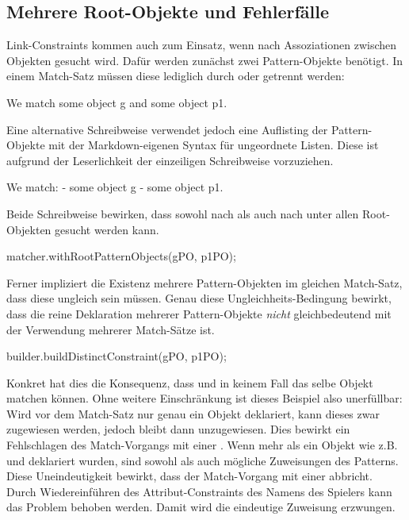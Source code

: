 \subsection{Mehrere Root-Objekte und Fehlerfälle}

Link-Constraints kommen auch zum Einsatz, wenn nach Assoziationen zwischen Objekten gesucht wird.
Dafür werden zunächst zwei Pattern-Objekte benötigt.
In einem Match-Satz müssen diese lediglich durch  oder \code{,} getrennt werden:

\begin{mdcodeblock}
    We match some object g and some object p1.
\end{mdcodeblock}

Eine alternative Schreibweise verwendet jedoch eine Auflisting der Pattern-Objekte mit der Markdown-eigenen Syntax für ungeordnete Listen.
Diese ist aufgrund der Leserlichkeit der einzeiligen Schreibweise vorzuziehen.

\begin{mdcodeblock}
    We match:
    - some object g
    - some object p1.
\end{mdcodeblock}

Beide Schreibweise bewirken, dass sowohl nach  als auch nach  unter allen Root-Objekten gesucht werden kann.

\begin{jcodeblock}
    matcher.withRootPatternObjects(gPO, p1PO);
\end{jcodeblock}

Ferner impliziert die Existenz mehrere Pattern-Objekten im gleichen Match-Satz, dass diese ungleich sein müssen.
Genau diese Ungleichheits-Bedingung bewirkt, dass die reine Deklaration mehrerer Pattern-Objekte \emph{nicht} gleichbedeutend mit der Verwendung mehrerer Match-Sätze ist.

\begin{jcodeblock}
    builder.buildDistinctConstraint(gPO, p1PO);
\end{jcodeblock}

Konkret hat dies die Konsequenz, dass  und  in keinem Fall das selbe Objekt matchen können.
Ohne weitere Einschränkung ist dieses Beispiel also unerfüllbar:
Wird vor dem Match-Satz nur genau ein Objekt deklariert, kann dieses zwar  zugewiesen werden, jedoch bleibt dann  unzugewiesen.
Dies bewirkt ein Fehlschlagen des Match-Vorgangs mit einer .
Wenn mehr als ein Objekt wie z.B.\  und  deklariert wurden, sind sowohl  als auch  mögliche Zuweisungen des Patterns.
Diese Uneindeutigkeit bewirkt, dass der Match-Vorgang mit einer  abbricht.
Durch Wiedereinführen des Attribut-Constraints des Namens des Spielers kann das Problem behoben werden.
Damit wird die eindeutige Zuweisung  erzwungen.

